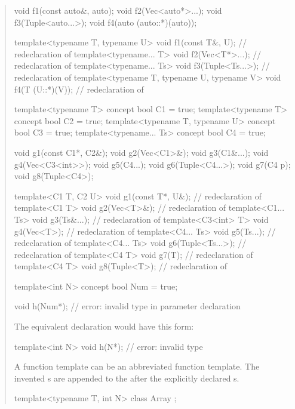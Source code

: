 \begin{quote}
\begin{codeblock}
void f1(const auto&, auto);
void f2(Vec<auto*>...);
void f3(Tuple<auto...>);
void f4(auto (auto::*)(auto));

template<typename T, typename U> void f1(const T&, U);             // redeclaration of 
template<typename... T> void f2(Vec<T*>...);                       // redeclaration of 
template<typename... Ts> void f3(Tuple<Ts...>);                    // redeclaration of 
template<typename T, typename U, typename V> void f4(T (U::*)(V)); // redeclaration of 

template<typename T> concept bool C1 = true;
template<typename T> concept bool C2 = true;
template<typename T, typename U> concept bool C3 = true;
template<typename... Ts> concept bool C4 = true;

void g1(const C1*, C2&);
void g2(Vec<C1>&);
void g3(C1&...);
void g4(Vec<C3<int>>);
void g5(C4...);
void g6(Tuple<C4...>);
void g7(C4 p);
void g8(Tuple<C4>);

template<C1 T, C2 U> void g1(const T*, U&); // redeclaration of 
template<C1 T> void g2(Vec<T>&);            // redeclaration of 
template<C1... Ts> void g3(Ts&...);         // redeclaration of 
template<C3<int> T> void g4(Vec<T>);        // redeclaration of 
template<C4... Ts> void g5(Ts...);          // redeclaration of 
template<C4... Ts> void g6(Tuple<Ts...>);   // redeclaration of 
template<C4 T> void g7(T);                  // redeclaration of 
template<C4 T> void g8(Tuple<T>);           // redeclaration of 
\end{codeblock}
\exitexample
% 
\enterexample
\begin{codeblock}
template<int N> concept bool Num = true;

void h(Num*); // error: invalid type in parameter declaration
\end{codeblock}
The equivalent declaration would have this form:
\begin{codeblock}
template<int N> void h(N*); // error: invalid type
\end{codeblock}
\exitexample

\pnum
A function template can be an abbreviated function template. The 
invented s are appended to the 
 after the explicitly declared 
s.

\enterexample
\begin{codeblock}
template<typename T, int N> class Array { };


\end{codeblock}
\end{quote}
